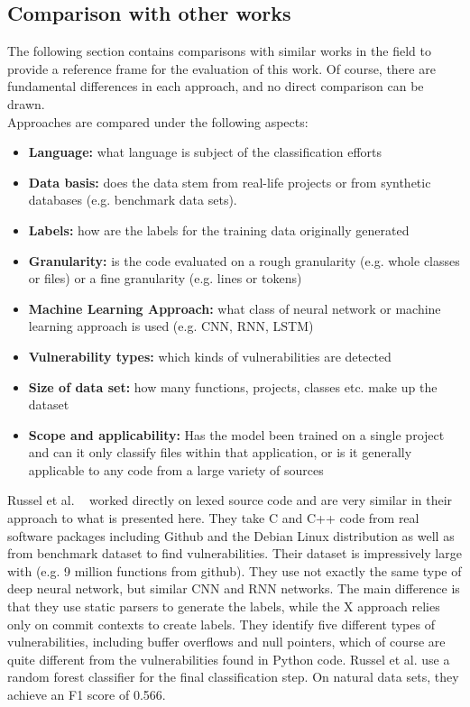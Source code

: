 \documentclass[
	a4paper,
	pagesize,
	pdftex,
	12pt,
	twoside, %
	BCOR=5mm, %
	ngerman,
	fleqn,
	final,
	]{scrartcl}
\begin{document}
\subsection{Comparison with other works}

The following section contains comparisons with similar works in the field to provide a reference frame for the evaluation of this work. Of course, there are fundamental differences in each approach, and no direct comparison can be drawn.\\
Approaches are compared under the following aspects:\\
\begin{itemize}
	\item \textbf{Language:} what language is subject of the classification efforts
	\item \textbf{Data basis:} does the data stem from real-life projects or from synthetic databases (e.g. benchmark data sets).
	\item \textbf{Labels:} how are the labels for the training data originally generated
	\item \textbf{Granularity:} is the code evaluated on a rough granularity (e.g. whole classes or files) or a fine granularity (e.g. lines or tokens)
	\item \textbf{Machine Learning Approach:} what class of neural network or machine learning approach is used (e.g. CNN, RNN, LSTM)
	\item \textbf{Vulnerability types:} which kinds of vulnerabilities are detected
	\item \textbf{Size of data set:} how many functions, projects, classes etc. make up the dataset
	\item \textbf{Scope and applicability:} Has the model been trained on a single project and can it only classify files within that application, or is it generally applicable to any code from a large variety of sources
\end{itemize}


Russel et al. ~\cite{Russell.2018} worked directly on lexed source code and are very similar in their approach to what is presented here. They take C and C++ code from real software packages including Github and the Debian Linux distribution as well as from benchmark dataset to find vulnerabilities. Their dataset is impressively large with (e.g. 9 million functions from github). They use not exactly the same type of deep neural network, but similar CNN and RNN networks. The main difference is that they use static parsers to generate the labels, while the X approach relies only on commit contexts to create labels. They identify five different types of vulnerabilities, including buffer overflows and null pointers, which of course are quite different from the vulnerabilities found in Python code. Russel et al. use a random forest classifier for the final classification step. On natural data sets, they achieve an F1 score of 0.566.\\
\end{document}
